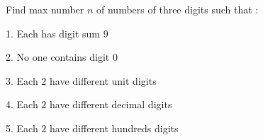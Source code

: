 Find max number $n$ of numbers of three digits such that :

1. Each has digit sum $9$

2. No one contains digit $0$

3. Each $2$ have different unit digits

4. Each $2$ have different decimal digits

5. Each $2$ have different hundreds digits